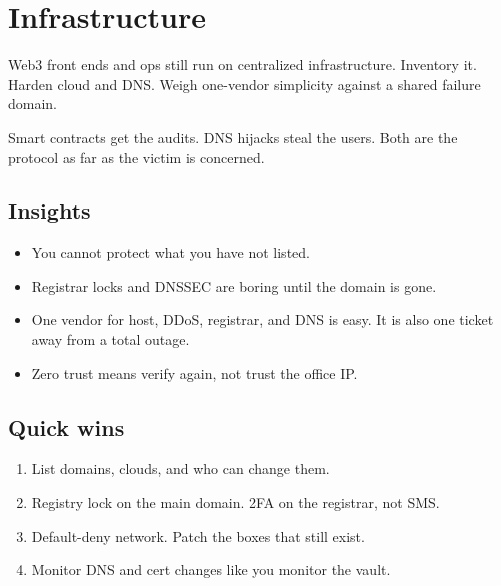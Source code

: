 \chapter{Infrastructure}

Web3 front ends and ops still run on centralized
infrastructure. Inventory it. Harden cloud and DNS.
Weigh one-vendor simplicity against a shared failure
domain.

Smart contracts get the audits. DNS hijacks steal the
users. Both are the protocol as far as the victim is
concerned.

\section{Insights}

\begin{itemize}
  \item You cannot protect what you have not listed.
  \item Registrar locks and DNSSEC are boring until the
  domain is gone.
  \item One vendor for host, DDoS, registrar, and DNS is
  easy. It is also one ticket away from a total outage.
  \item Zero trust means verify again, not trust the
  office IP.
\end{itemize}

\section{Quick wins}

\begin{enumerate}
  \item List domains, clouds, and who can change them.
  \item Registry lock on the main domain. 2FA on the
  registrar, not SMS.
  \item Default-deny network. Patch the boxes that still
  exist.
  \item Monitor DNS and cert changes like you monitor
  the vault.
\end{enumerate}
